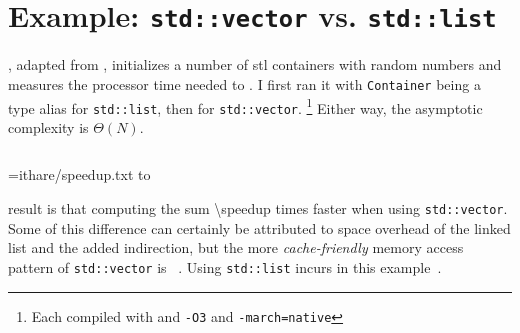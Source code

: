 \section{Example: \texttt{std::vector} vs. \texttt{std::list}}

%
, adapted from \textcite{bigos}, initializes a number of \acrshort{stl} containers
with random numbers and measures the processor time needed to .
%
I first ran it with \texttt{Container} being a type alias for
\texttt{std::list}, then for \texttt{std::vector}.%
\footnote{%
   Each compiled with  and \texttt{-O3} and
   \texttt{-march=native}
}
Either way, the asymptotic complexity is \(\Theta(N)\).

\begin{center}
   \inputminted[firstline=29]{cpp}{ithare/list-vs-vector.cpp}
   \label{lst:ithare}
\end{center}

\newread\file
\openin\file=ithare/speedup.txt
\read\file to \speedup
\closein\file




 result is that computing the sum  \num[round-mode=places,
round-precision=0]{\speedup} times faster when using \texttt{std::vector}.  Some
of this difference can certainly be attributed to space overhead of the linked list and
the added indirection, but the more \emph{cache-friendly} memory access pattern of
\texttt{std::vector} is ~\cite[5\psq]{bigos}.
Using \texttt{std::list} incurs  in this
example~\cite[6]{bigos}.

